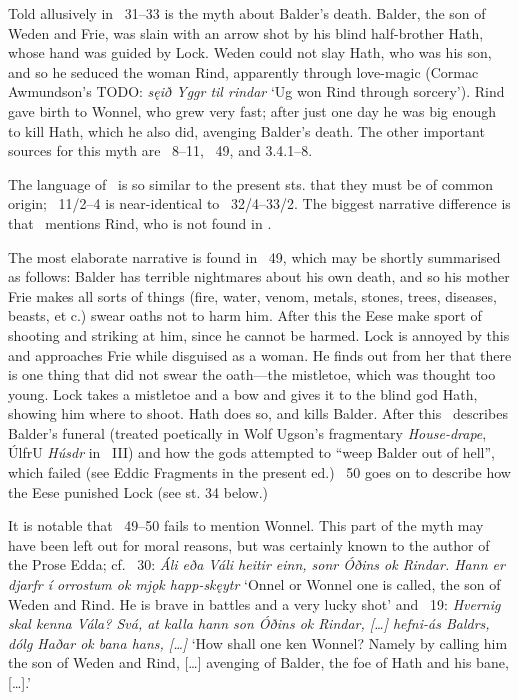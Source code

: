 \sectionline

{\small Told allusively in \Voluspa\ 31–33 is the myth about Balder’s death.  Balder, the son of Weden and Frie, was slain with an arrow shot by his blind half-brother Hath, whose hand was guided by Lock.  Weden could not slay Hath, who was his son, and so he seduced the woman Rind, apparently through love-magic (Cormac Awmundson’s TODO: \emph{sęið Yggr til rindar} ‘Ug won Rind through sorcery’).  Rind gave birth to Wonnel, who grew very fast; after just one day he was big enough to kill Hath, which he also did, avenging Balder’s death.  The other important sources for this myth are \Baldrsdraumar\ 8–11, \Gylfaginning\ 49, and \textcite{Saxo} 3.4.1–8.

The language of \Baldrsdraumar\ is so similar to the present sts. that they must be of common origin; \Baldrsdraumar\ 11/2–4 is near-identical to \Voluspa\ 32/4–33/2.  The biggest narrative difference is that \Baldrsdraumar\ mentions Rind, who is not found in \Voluspa.

The most elaborate narrative is found in \Gylfaginning\ 49, which may be shortly summarised as follows: Balder has terrible nightmares about his own death, and so his mother Frie makes all sorts of things (fire, water, venom, metals, stones, trees, diseases, beasts, et c.) swear oaths not to harm him.  After this the Eese make sport of shooting and striking at him, since he cannot be harmed.  Lock is annoyed by this and approaches Frie while disguised as a woman.  He finds out from her that there is one thing that did not swear the oath—the mistletoe, which was thought too young.  Lock takes a mistletoe and a bow and gives it to the blind god Hath, showing him where to shoot.  Hath does so, and kills Balder.  After this \Gylfaginning\ describes Balder’s funeral (treated poetically in Wolf Ugson’s fragmentary \emph{House-drape}, ÚlfrU \emph{Húsdr} in \Skp\ III) and how the gods attempted to “weep Balder out of hell”, which failed (see Eddic Fragments in the present ed.)  \Gylfaginning\ 50 goes on to describe how the Eese punished Lock (see st. 34 below.)

It is notable that \Gylfaginning\ 49–50 fails to mention Wonnel.  This part of the myth may have been left out for moral reasons, but was certainly known to the author of the Prose Edda; cf. \Gylfaginning\ 30: \emph{Áli eða Váli heitir einn, sonr Óðins ok Rindar. Hann er djarfr í orrostum ok mjǫk happ-skęytr} ‘Onnel or Wonnel one is called, the son of Weden and Rind. He is brave in battles and a very lucky shot’ and \Skaldskaparmal\ 19: \emph{Hvernig skal kenna Vála? Svá, at kalla hann son Óðins ok Rindar, [\dots] hefni-ás Baldrs, dólg Haðar ok bana hans, [\dots]} ‘How shall one ken Wonnel? Namely by calling him the son of Weden and Rind, [\dots] avenging  of Balder, the foe of Hath and his bane, [\dots].’

}
